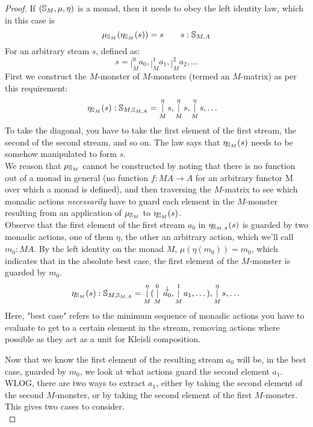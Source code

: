\documentclass{article}
\begin{document}
\begin{proof}
If $(\mathbb{S}_{M}, \mu, \eta)$ is a monad, then it needs to obey the left identity law, which in this case is
$$
\mu_{\mathbb{S}_{M}}(\eta_{\mathbb{S}_{M}}(s)) = s
\qquad s : \mathbb{S}_{M,A}
$$
For an arbitrary steam $s$, defined as:
$$
s = \mathop{|}_M^0 a_0, \mathop{|}_M^1 a_1, \mathop{|}_M^2  a_2, \dots
$$
First we construct the $M$-monster of $M$-monsters (termed an $M$-matrix) as per this requirement:
\begin{align*}
&\eta_{\mathbb{S}_{M}}(s) : \mathbb{S}_{M,\mathbb{S}_{M,A}} = \mathop{|}_M^\eta s, \mathop{|}_M^\eta s, \mathop{|}_M^\eta s, \dots
\end{align*}
To take the diagonal, you have to take the first element of the first stream, the second of the second stream, and so on. The law says that $\eta_{\mathbb{S}_{M}}(s)$ needs to be somehow manipulated to form $s$. \\

We reason that $\mu_{\mathbb{S}_{M}}$ cannot be constructed by noting that there is no function out of a monad in general (no function $f : MA \to A$ for an arbitrary functor M over which a monad is defined), and then traversing the $M$-matrix to see which monadic actions \emph{necessarily} have to guard each element in the $M$-monster resulting from an application of $\mu_{\mathbb{S}_{M}}$ to $\eta_{\mathbb{S}_{M}}(s)$.\\

Observe that the first element of the first stream $a_0$ in $\eta_{\mathbb{S}_{M,A}}(s)$ is guarded by two monadic actions, one of them $\eta$, the other an arbitrary action, which we'll call $m_0 : MA$. By the left identity on the monad $M$, $\mu(\eta(m_0)) = m_0$, which indicates that in the absolute best case, the first element of the $M$-monster is guarded by $m_0$.
$$
\eta_{\mathbb{S}_{M}}(s) : \mathbb{S}_{M,\mathbb{S}_{M,A}} = \mathop{|}_M^\eta (\mathop{|}_M^0 \stackrel{\downarrow}{a_0}, \mathop{|}_M^1 a_1, \dots), \mathop{|}_M^\eta s, \dots
$$
Here, "best case" refers to the minimum sequence of monadic actions you have to evaluate to get to a certain element in the stream, removing \eta actions where possible as they act as a unit for Kleisli composition.

Now that we know the first element of the resulting stream $a_0$ will be, in the best case, guarded by $m_0$, we look at what actions guard the second element $a_1$. WLOG, there are two ways to extract $a_1$, either by taking the second element of the second $M$-monster, or by taking the second element of the first $M$-monster. This gives two cases to consider.\\


\end{proof}
\end{document}
